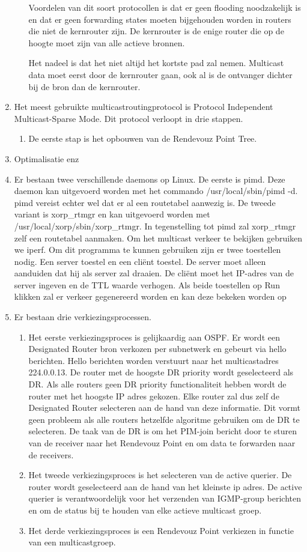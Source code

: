 \documentclass{report}
\begin{document}
\begin{enumerate}
\begin{itemize}
			Voordelen van dit soort protocollen is dat er geen flooding noodzakelijk is en dat er geen forwarding states moeten bijgehouden worden in routers die niet de kernrouter zijn. De kernrouter is de enige router die op de hoogte moet zijn van alle actieve bronnen.
			
			Het nadeel is dat het niet altijd het kortste pad zal nemen. Multicast data moet eerst door de kernrouter gaan, ook al is de ontvanger dichter bij de bron dan de kernrouter. 
		\end{itemize}
	\item Het meest gebruikte multicastroutingprotocol is Protocol Independent Multicast-Sparse Mode. Dit protocol verloopt in drie stappen.
	\begin{enumerate}
		\item De eerste stap is het opbouwen van de Rendevouz Point Tree. 
	\end{enumerate}
	\item Optimalisatie enz
	\item Er bestaan twee verschillende daemons op Linux. De eerste is pimd. Deze daemon kan uitgevoerd worden met het commando /usr/local/sbin/pimd -d. pimd vereist echter wel dat er al een routetabel aanwezig is. De tweede variant is xorp\_rtmgr en kan uitgevoerd worden met /usr/local/xorp/sbin/xorp\_rtmgr. In tegenstelling tot pimd zal xorp\_rtmgr zelf een routetabel aanmaken. Om het multicast verkeer te bekijken gebruiken we iperf. Om dit programma te kunnen gebruiken zijn er twee toestellen nodig. Een server toestel en een cliënt toestel. De server moet alleen aanduiden dat hij als server zal draaien. De cliënt moet het IP-adres van de server ingeven en de TTL waarde verhogen. Als beide toestellen op Run klikken zal er verkeer gegenereerd worden en kan deze bekeken worden op
	\item Er bestaan drie verkiezingsprocessen. 
	\begin{enumerate}
		\item Het eerste verkiezingsproces is gelijkaardig aan OSPF. Er wordt een Designated Router bron verkozen per subnetwerk en gebeurt via hello berichten. Hello berichten worden verstuurt naar het multicastadres 224.0.0.13. De router met de hoogste DR priority wordt geselecteerd als DR. Als alle routers geen DR priority functionaliteit hebben wordt de router met het hoogste IP adres gekozen. Elke router zal dus zelf de Designated Router selecteren aan de hand van deze informatie. Dit vormt geen probleem als alle routers hetzelfde algoritme gebruiken om de DR te selecteren. De taak van de DR is om het PIM-join bericht door te sturen van de receiver naar het Rendevouz Point en om data te forwarden naar de receivers.
		\item Het tweede verkiezingsproces is het selecteren van de active querier. De router wordt geselecteerd aan de hand van het kleinste ip adres. De active querier is verantwoordelijk voor het verzenden van IGMP-group berichten en om de status bij te houden van elke actieve multicast groep.
		\item Het derde verkiezingsproces is een Rendevouz Point verkiezen in functie van een multicastgroep. 
	\end{enumerate}
\end{enumerate}
\end{document}
